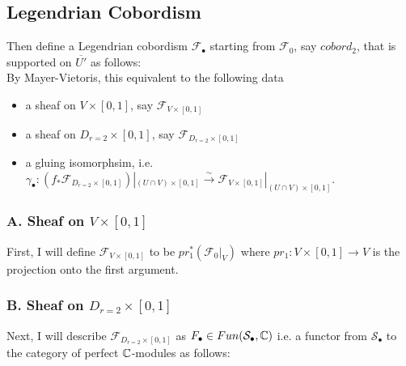 \subsection{Legendrian Cobordism}
Then define a Legendrian cobordism $\mathscr{F}_\bullet$ starting from $\mathscr{F}_0$, say $cobord_2$, that is supported on $\overline{U'}$ as follows:\\

By Mayer-Vietoris, this equivalent to the following data
\begin{itemize}
\item a sheaf on $V\times [0,1]$, say $\mathscr{F}_{V\times [0,1]}$

\item a sheaf on $D_{r=2}\times [0,1]$, say $\mathscr{F}_{D_{r=2}\times [0,1]}$

\item a gluing isomorphsim, i.e. $\gamma_\bullet : (f_*\mathscr{F}_{D_{r=2}\times [0,1]})|_{(U\cap V)\times [0,1]} \xrightarrow{\sim} \mathscr{F}_{V\times [0,1]}|_{(U\cap V)\times [0,1]}$.
\end{itemize}
\subsubsection{A. Sheaf on $V\times [0,1]$}
First, I will define $\mathscr{F}_{V\times [0,1]}$ to be $pr_1^*(\mathscr{F}_0|_V)$ where $pr_1 : V \times [0,1] \rightarrow V$ is the projection onto the first argument.
\subsubsection{B. Sheaf on $D_{r=2}\times [0,1]$}
Next, I will describe $\mathscr{F}_{D_{r=2}\times [0,1]}$ as $F_\bullet \in Fun(\mathcal{S}_\bullet,\mathbb{C})$ i.e. a functor from $\mathcal{S}_\bullet$ to the category of perfect $\mathbb{C}$-modules as follows: 

